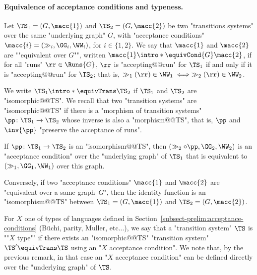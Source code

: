 \documentclass{theoretics}
\begin{document}
\paragraph*{Equivalence of acceptance conditions and typeness.}
 Let $\TS_1=(G, \macc{1})$ and $\TS_2=(G, \macc{2})$ be two "transitions systems" over the same "underlying graph" $G$, with "acceptance conditions" $\macc{i} = (\gg_i, \GG_i, \WW_i)$, for $i \in \{1,2\}$.
\AP We say that $\macc{1}$ and $\macc{2}$ are ""equivalent over $G$"", written $\macc{1} \intro*\equivCond{G} \macc{2}$, if for all "runs" $\rr\in \Runs{G}$, $\rr$ is "accepting@@run" for $\TS_1$ if and only if it is "accepting@@run" for $\TS_2$; that is, $\gg_{1}(\rr)\in \WW_1 \iff \gg_{2}(\rr)\in \WW_2$.

\AP We write $\TS_1 \intro*\equivTrans \TS_2$ if $\TS_1$ and $\TS_2$ are "isomorphic@@TS". We recall that two "transition systems" are "isomorphic@@TS" if there is a "morphism of transition systems" $\pp\colon \TS_1\to \TS_2$ whose inverse is also a "morphism@@TS", that is, $\pp$ and $\inv{\pp}$ "preserve the acceptance of runs".


\begin{remark}\label{rmk-typ:condition-transferred-by-isomorphism}
	If $\pp\colon \TS_1 \to \TS_2$ is an "isomorphism@@TS", then $(\gg_2\circ \pp, \GG_2, \WW_2)$ is an "acceptance condition" over the "underlying graph" of $\TS_1$ that is equivalent to $(\gg_1, \GG_1, \WW_1)$ over this graph.
	
	Conversely, if two "acceptance conditions" $\macc{1}$ and $\macc{2}$ are "equivalent over a same graph~$G$", then the identity function is an "isomorphism@@TS" between $\TS_1=(G, \macc{1})$ and $\TS_2=(G, \macc{2})$.
\end{remark}



\AP For $X$ one of types of languages defined in Section~\ref{subsect-prelim:acceptance-conditions} (B\"uchi, parity, Muller, etc...), we say that a "transition system" $\TS$ is ""$X$ type"" if there exists an "isomorphic@@TS" "transition system" $\TS'\equivTrans \TS$ using an "$X$ acceptance condition". We note that, by the previous remark, in that case an "$X$ acceptance condition" can be defined directly over the "underlying graph" of $\TS$.
\end{document}
